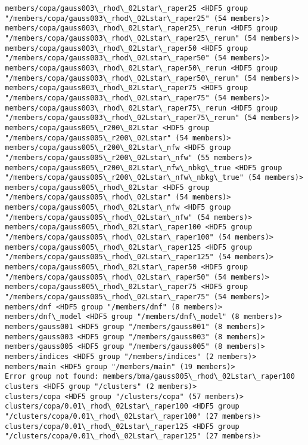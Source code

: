 \documentclass[11pt]{article}
\begin{document}
\begin{Verbatim}[commandchars=\\\{\}]
members/copa/gauss003\_rhod\_02Lstar\_raper25 <HDF5 group "/members/copa/gauss003\_rhod\_02Lstar\_raper25" (54 members)>
members/copa/gauss003\_rhod\_02Lstar\_raper25\_rerun <HDF5 group "/members/copa/gauss003\_rhod\_02Lstar\_raper25\_rerun" (54 members)>
members/copa/gauss003\_rhod\_02Lstar\_raper50 <HDF5 group "/members/copa/gauss003\_rhod\_02Lstar\_raper50" (54 members)>
members/copa/gauss003\_rhod\_02Lstar\_raper50\_rerun <HDF5 group "/members/copa/gauss003\_rhod\_02Lstar\_raper50\_rerun" (54 members)>
members/copa/gauss003\_rhod\_02Lstar\_raper75 <HDF5 group "/members/copa/gauss003\_rhod\_02Lstar\_raper75" (54 members)>
members/copa/gauss003\_rhod\_02Lstar\_raper75\_rerun <HDF5 group "/members/copa/gauss003\_rhod\_02Lstar\_raper75\_rerun" (54 members)>
members/copa/gauss005\_r200\_02Lstar <HDF5 group "/members/copa/gauss005\_r200\_02Lstar" (54 members)>
members/copa/gauss005\_r200\_02Lstar\_nfw <HDF5 group "/members/copa/gauss005\_r200\_02Lstar\_nfw" (55 members)>
members/copa/gauss005\_r200\_02Lstar\_nfw\_nbkg\_true <HDF5 group "/members/copa/gauss005\_r200\_02Lstar\_nfw\_nbkg\_true" (54 members)>
members/copa/gauss005\_rhod\_02Lstar <HDF5 group "/members/copa/gauss005\_rhod\_02Lstar" (54 members)>
members/copa/gauss005\_rhod\_02Lstar\_nfw <HDF5 group "/members/copa/gauss005\_rhod\_02Lstar\_nfw" (54 members)>
members/copa/gauss005\_rhod\_02Lstar\_raper100 <HDF5 group "/members/copa/gauss005\_rhod\_02Lstar\_raper100" (54 members)>
members/copa/gauss005\_rhod\_02Lstar\_raper125 <HDF5 group "/members/copa/gauss005\_rhod\_02Lstar\_raper125" (54 members)>
members/copa/gauss005\_rhod\_02Lstar\_raper50 <HDF5 group "/members/copa/gauss005\_rhod\_02Lstar\_raper50" (54 members)>
members/copa/gauss005\_rhod\_02Lstar\_raper75 <HDF5 group "/members/copa/gauss005\_rhod\_02Lstar\_raper75" (54 members)>
members/dnf <HDF5 group "/members/dnf" (8 members)>
members/dnf\_model <HDF5 group "/members/dnf\_model" (8 members)>
members/gauss001 <HDF5 group "/members/gauss001" (8 members)>
members/gauss003 <HDF5 group "/members/gauss003" (8 members)>
members/gauss005 <HDF5 group "/members/gauss005" (8 members)>
members/indices <HDF5 group "/members/indices" (2 members)>
members/main <HDF5 group "/members/main" (19 members)>
Error group not found: members/bma/gauss005\_rhod\_02Lstar\_raper100
clusters <HDF5 group "/clusters" (2 members)>
clusters/copa <HDF5 group "/clusters/copa" (57 members)>
clusters/copa/0.01\_rhod\_02Lstar\_raper100 <HDF5 group "/clusters/copa/0.01\_rhod\_02Lstar\_raper100" (27 members)>
clusters/copa/0.01\_rhod\_02Lstar\_raper125 <HDF5 group "/clusters/copa/0.01\_rhod\_02Lstar\_raper125" (27 members)>

\end{Verbatim}
\end{document}
